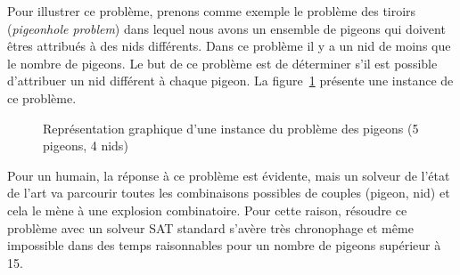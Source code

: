 Pour illustrer ce problème, prenons comme exemple le problème des tiroirs (\textit{pigeonhole problem}) dans lequel nous avons un ensemble de pigeons qui doivent êtres attribués à des nids différents. Dans ce problème il y a un nid de moins que le nombre de pigeons.
Le but de ce problème est de déterminer s'il est possible d'attribuer un nid différent à chaque pigeon.
La figure~\ref{fig:holefr} présente une instance de ce problème.

\begin{figure}[!htbp]
	\centering
	\caption{Représentation graphique d'une instance du problème des pigeons (5 pigeons, 4 nids)}
	\label{fig:holefr}
\end{figure}


Pour un humain, la réponse à ce problème est évidente, mais un solveur de l'état de l'art va parcourir toutes 
les combinaisons possibles de couples (pigeon, nid) et cela le mène à une explosion combinatoire.
Pour cette raison, résoudre ce problème avec un solveur SAT standard s'avère très chronophage et même impossible 
dans des temps raisonnables pour un nombre de pigeons supérieur à 15.

%
%

